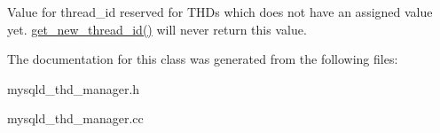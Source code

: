 Value for thread\+\_\+id reserved for T\+H\+Ds which does not have an assigned value yet. \mbox{\hyperlink{classGlobal__THD__manager_a854e178c07d57bb7aa218f2cbca70808}{get\+\_\+new\+\_\+thread\+\_\+id()}} will never return this value. 

The documentation for this class was generated from the following files\+:\begin{DoxyCompactItemize}
\item 
mysqld\+\_\+thd\+\_\+manager.\+h\item 
mysqld\+\_\+thd\+\_\+manager.\+cc\end{DoxyCompactItemize}
